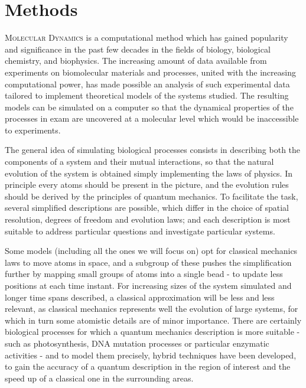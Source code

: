 \chapter{Methods} \label{chapter:MD}

\lettrine{M}{olecular Dynamics} is a computational method which has gained popularity and significance in the past few decades in the fields of biology, biological chemistry, and biophysics.
%
The increasing amount of data available from experiments on biomolecular materials and processes, united with the increasing computational power, has made possible an analysis of such experimental data tailored to implement theoretical models of the systems studied.
%
The resulting models can be simulated on a computer so that the dynamical properties of the processes in exam are uncovered at a molecular level which would be inaccessible to experiments.

The general idea of simulating biological processes consists in describing both the components of a system and their mutual interactions, so that the natural evolution of the system is obtained simply implementing the laws of physics. In principle every atoms should be present in the picture, and the evolution rules should be derived by the principles of quantum mechanics.
%
To facilitate the task, several simplified descriptions are possible, which differ in the choice of spatial resolution, degrees of freedom and evolution laws; and each description is most suitable to address particular questions and investigate particular systems.

Some models (including all the ones we will focus on) opt for classical mechanics laws to move atoms in space, and a subgroup of these pushes the simplification further by mapping small groups of atoms into a single bead - to update less positions at each time instant.
%
For increasing sizes of the system simulated and longer time spans described, a classical approximation will be less and less relevant, as classical mechanics represents well the evolution of large systems, for which in turn some atomistic details are of minor importance.
%
There are certainly biological processes for which a quantum mechanics description is more suitable - such as photosynthesis, DNA mutation processes or particular enzymatic activities - and to model them precisely, hybrid techniques have been developed, to gain the accuracy of a quantum description in the region of interest and the speed up of a classical one in the surrounding areas.

